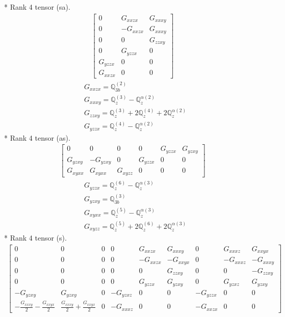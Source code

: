 \documentclass[fleqn,8pt,landscape]{jsarticle}
\begin{document}
* Rank 4 tensor (sa).
\begin{align*}
\begin{bmatrix} 0 & G_{xxzx} & G_{xxxy} \\ 0 & - G_{xxzx} & G_{xxxy} \\ 0 & 0 & G_{zzxy} \\ 0 & G_{yzzx} & 0 \\ G_{yzzx} & 0 & 0 \\ G_{xxzx} & 0 & 0 \end{bmatrix}
\end{align*}
\begin{align*}
& G_{xxzx} = \mathbb{Q}_{3b}^{(2)} \\
& G_{xxxy} = \mathbb{Q}_{z}^{(3)} - \mathbb{Q}_{z}^{\alpha(2)} \\
& G_{zzxy} = \mathbb{Q}_{z}^{(3)} + 2 \mathbb{Q}_{z}^{(4)} + 2 \mathbb{Q}_{z}^{\alpha(2)} \\
& G_{yzzx} = \mathbb{Q}_{z}^{(4)} - \mathbb{Q}_{z}^{\alpha(2)}
\end{align*}
* Rank 4 tensor (as).
\begin{align*}
\begin{bmatrix} 0 & 0 & 0 & 0 & G_{yzzx} & G_{yzxy} \\ G_{yzxy} & - G_{yzxy} & 0 & G_{yzzx} & 0 & 0 \\ G_{xyxx} & G_{xyxx} & G_{xyzz} & 0 & 0 & 0 \end{bmatrix}
\end{align*}
\begin{align*}
& G_{yzzx} = \mathbb{Q}_{z}^{(6)} - \mathbb{Q}_{z}^{\alpha(3)} \\
& G_{yzxy} = \mathbb{Q}_{3b}^{(3)} \\
& G_{xyxx} = \mathbb{Q}_{z}^{(5)} - \mathbb{Q}_{z}^{\alpha(3)} \\
& G_{xyzz} = \mathbb{Q}_{z}^{(5)} + 2 \mathbb{Q}_{z}^{(6)} + 2 \mathbb{Q}_{z}^{\alpha(3)}
\end{align*}
* Rank 4 tensor (s).
\begin{align*}
\begin{bmatrix} 0 & 0 & 0 & 0 & G_{xxzx} & G_{xxxy} & 0 & G_{xxxz} & G_{xxyx} \\ 0 & 0 & 0 & 0 & - G_{xxzx} & - G_{xxyx} & 0 & - G_{xxxz} & - G_{xxxy} \\ 0 & 0 & 0 & 0 & 0 & G_{zzxy} & 0 & 0 & - G_{zzxy} \\ 0 & 0 & 0 & 0 & G_{yzzx} & G_{yzxy} & 0 & G_{yzxz} & G_{yzxy} \\ - G_{yzxy} & G_{yzxy} & 0 & - G_{yzxz} & 0 & 0 & - G_{yzzx} & 0 & 0 \\ - \frac{G_{xxxy}}{2} - \frac{G_{xxyx}}{2} & \frac{G_{xxxy}}{2} + \frac{G_{xxyx}}{2} & 0 & - G_{xxxz} & 0 & 0 & - G_{xxzx} & 0 & 0 \end{bmatrix}
\end{align*}
\end{document}
